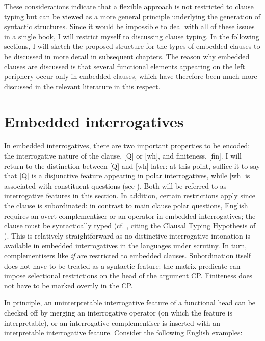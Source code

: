 These considerations indicate that a flexible approach is not restricted to clause typing but can be viewed as a more general principle underlying the generation of syntactic structures. Since it would be impossible to deal with all of these issues in a single book, I will restrict myself to discussing clause typing. In the following sections, I will sketch the proposed structure for the types of embedded clauses to be discussed in more detail in subsequent chapters. The reason why embedded clauses are discussed is that several functional elements appearing on the left periphery occur only in embedded clauses, which have therefore been much more discussed in the relevant literature in this respect.

\section{Embedded interrogatives} \label{sec:2interrogatives}
In embedded interrogatives, there are two important properties to be encoded: the interrogative nature of the clause, [Q] or [wh], and finiteness, [fin]. I will return to the distinction between [Q] and [wh] later: at this point, suffice it to say that [Q] is a disjunctive feature appearing in polar interrogatives, while [wh] is associated with constituent questions (see \citealt{bayer2004}). Both will be referred to as interrogative features in this section. In addition, certain restrictions apply since the clause is subordinated: in contrast to main clause polar questions, English requires an overt complementiser or an operator in embedded interrogatives; the clause must be syntactically typed (cf. \citealt[89]{bayerbrandner2008}, citing the Clausal Typing  Hypothesis of \citealt{cheng1991diss}). This is relatively straightforward as no distinctive interrogative intonation is available in embedded interrogatives in the languages under scrutiny. In turn, complementisers like \textit{if} are restricted to embedded clauses. Subordination itself does not have to be treated as a syntactic feature: the matrix predicate can impose selectional restrictions on the head of the argument CP. Finiteness does not have to be marked overtly in the CP.

In principle, an uninterpretable interrogative feature of a functional head can be checked off by merging an interrogative operator (on which the feature is interpretable), or an interrogative complementiser is inserted with an interpretable interrogative feature. Consider the following English examples:

